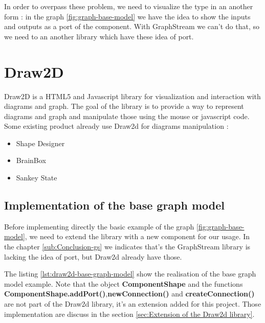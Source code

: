 In order to overpass these problem, we need to visualize the type in an another
form : in the graph \ref{fig:graph-base-model} we have the idea to show the
inputs and outputs as a port of the component. With GraphStream we can't do
that, so we need to an another library which have these idea of port.



\section{Draw2D}
\label{sec:Draw2D}

Draw2D is a HTML5 and Javascript library for visualization and interaction with
diagrams and graph\cite{draw2d}. The goal of the library is to provide a way to
represent diagrams and graph and manipulate those using the mouse or javascript
code. Some existing product already use Draw2d for diagrams manipulation :

\begin{itemize}
\item Shape Designer\cite{draw2d}
\item BrainBox\cite{draw2d}
\item Sankey State\cite{draw2d}
\end{itemize}

\subsection{Implementation of the base graph model}
\label{sub:Implementation of the base graph model}

Before implementing directly the basic example of the graph \ref{fig:graph-base-model},
we need to extend the library with a new component for our usage.
In the chapter \ref{sub:Conclusion-gs} we indicates that's the GraphStream library is lacking the idea of port, but Draw2d already have those.

The listing \ref{lst:draw2d-base-graph-model} show the realisation of the base
graph model example. Note that the object \textbf{ComponentShape} and the
functions \textbf{ComponentShape.addPort()},\textbf{newConnection()} and
\textbf{createConnection()} are not part of the Draw2d library, it's an
extension added for this project. Those implementation are discuss in the
section \ref{sec:Extension of the Draw2d library}.

